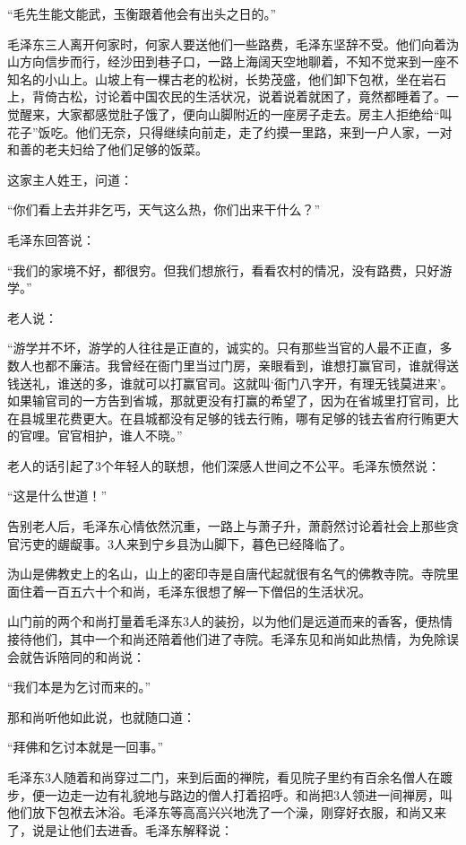 \documentclass[../../dazhuan.tex]{subfiles}
\begin{document}
“毛先生能文能武，玉衡跟着他会有出头之日的。”

毛泽东三人离开何家时，何家人要送他们一些路费，毛泽东坚辞不受。他们向着沩山方向信步而行，经沙田到巷子口，一路上海阔天空地聊着，不知不觉来到一座不知名的小山上。山坡上有一棵古老的松树，长势茂盛，他们卸下包袱，坐在岩石上，背倚古松，讨论着中国农民的生活状况，说着说着就困了，竟然都睡着了。一觉醒来，大家都感觉肚子饿了，便向山脚附近的一座房子走去。房主人拒绝给“叫花子”饭吃。他们无奈，只得继续向前走，走了约摸一里路，来到一户人家，一对和善的老夫妇给了他们足够的饭菜。

这家主人姓王，问道：

“你们看上去并非乞丐，天气这么热，你们出来干什么？”

毛泽东回答说：

“我们的家境不好，都很穷。但我们想旅行，看看农村的情况，没有路费，只好游学。”

老人说：

“游学并不坏，游学的人往往是正直的，诚实的。只有那些当官的人最不正直，多数人也都不廉洁。我曾经在衙门里当过门房，亲眼看到，谁想打赢官司，谁就得送钱送礼，谁送的多，谁就可以打赢官司。这就叫‘衙门八字开，有理无钱莫进来’。如果输官司的一方告到省城，那就更没有打赢的希望了，因为在省城里打官司，比在县城里花费更大。在县城都没有足够的钱去行贿，哪有足够的钱去省府行贿更大的官哩。官官相护，谁人不晓。”

老人的话引起了3个年轻人的联想，他们深感人世间之不公平。毛泽东愤然说：

“这是什么世道！”

告别老人后，毛泽东心情依然沉重，一路上与萧子升，萧蔚然讨论着社会上那些贪官污吏的龌龊事。3人来到宁乡县沩山脚下，暮色已经降临了。

沩山是佛教史上的名山，山上的密印寺是自唐代起就很有名气的佛教寺院。寺院里面住着一百五六十个和尚，毛泽东很想了解一下僧侣的生活状况。

山门前的两个和尚打量着毛泽东3人的装扮，以为他们是远道而来的香客，便热情接待他们，其中一个和尚还陪着他们进了寺院。毛泽东见和尚如此热情，为免除误会就告诉陪同的和尚说：

“我们本是为乞讨而来的。”

那和尚听他如此说，也就随口道：

“拜佛和乞讨本就是一回事。”

毛泽东3人随着和尚穿过二门，来到后面的禅院，看见院子里约有百余名僧人在踱步，便一边走一边有礼貌地与路边的僧人打着招呼。和尚把3人领进一间禅房，叫他们放下包袱去沐浴。毛泽东等高高兴兴地洗了一个澡，刚穿好衣服，和尚又来了，说是让他们去进香。毛泽东解释说：
\end{document}
